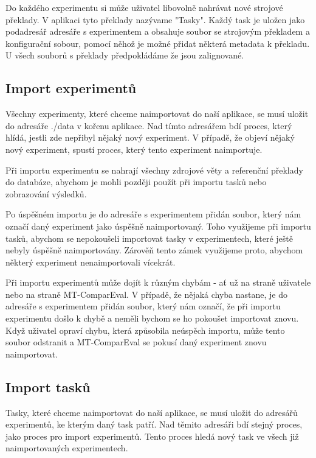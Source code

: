 Do každého experimentu si může uživatel libovolně nahrávat nové strojové překlady.
V aplikaci tyto překlady nazývame "Tasky".
Každý task je uložen jako podadresář adresáře s experimentem
  a obsahuje soubor se strojovým překladem
  a konfigurační sobour, pomocí něhož je možné přidat některá metadata k překladu. 
U všech souborů s překlady předpokládáme že jsou zalignované.

\subsection{Import experimentů}
Všechny experimenty, které chceme naimportovat do naší aplikace,
  se musí uložit do adresáře ./data v kořenu aplikace.
Nad tímto adresářem bdí proces, který hlídá,
  jestli zde nepřibyl nějaký nový experiment.
V případě, že objeví nějaký nový experiment,
  spustí proces, který tento experiment naimportuje.

Při importu experimentu se nahrají všechny zdrojové věty
  a referenční překlady do databáze,
  abychom je mohli později použít při importu tasků
  nebo zobrazování výsledků.

Po úspěšném importu je do adresáře s experimentem přidán soubor,
  který nám označí daný experiment jako úspěšně naimportovaný.
Toho využijeme při importu tasků,
  abychom se nepokoušeli importovat tasky v experimentech,
  které ještě nebyly úspěšně naimportovány.
Zárověň tento zámek využijeme proto,
  abychom některý experiment nenaimportovali vícekrát.

Při importu experimentů může dojít k různým chybám -
  ať už na straně uživatele nebo na straně MT-ComparEval.
V případě, že nějaká chyba nastane,
  je do adresáře s experimentem přidán soubor,
  který nám označí,
  že při importu experimentu došlo k chybě
  a neměli bychom se ho pokoušet importovat znovu.
Když uživatel opraví chybu,
  která způsobila neúspěch importu,
  může tento soubor odstranit
  a MT-ComparEval se pokusí daný experiment znovu naimportovat.

\subsection{Import tasků}
Tasky, které chceme naimportovat do naší aplikace,
  se musí uložit do adresářů experimentů,
  ke kterým daný task patří.
Nad těmito adresáři bdí stejný proces,
  jako proces pro import experimentů.
Tento proces hledá nový task ve všech již 
  naimportovaných experimentech.

